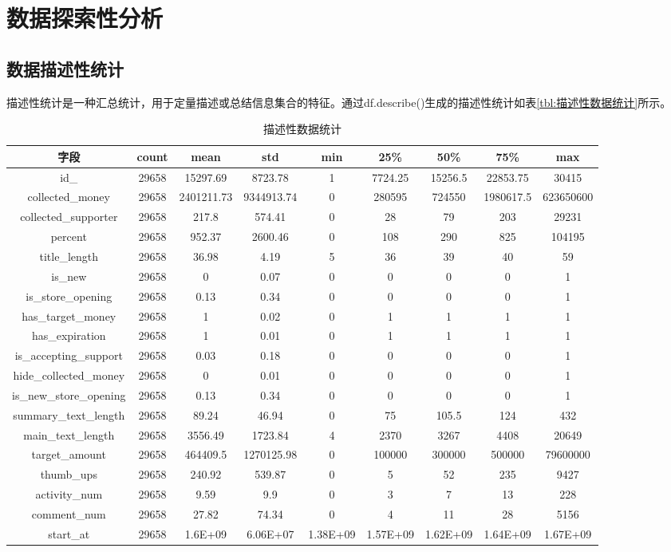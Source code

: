 \documentclass[lang=cn,a4paper]{elegantpaper}
\begin{document}
\section{数据探索性分析}
\subsection{数据描述性统计}
描述性统计是一种汇总统计，用于定量描述或总结信息集合的特征。通过df.describe()生成的描述性统计如表\ref{tbl:描述性数据统计}所示。

\begin{table}[!htbp]
\centering
\caption{描述性数据统计}
  \begin{tabular}{ccccccccc}
  \toprule
  字段&count&mean &std &min &25\% &50\% &75\% &max\\
  \midrule
  id\_&29658&15297.69&8723.78&1&7724.25&15256.5&22853.75&30415\\
  collected\_money&29658&2401211.73&9344913.74&0&280595&724550&1980617.5&623650600\\
  collected\_supporter&29658&217.8&574.41&0&28&79&203&29231\\
  percent&29658&952.37&2600.46&0&108&290&825&104195\\
  title\_length&29658&36.98&4.19&5&36&39&40&59\\
  is\_new&29658&0&0.07&0&0&0&0&1\\
  is\_store\_opening&29658&0.13&0.34&0&0&0&0&1\\
  has\_target\_money&29658&1&0.02&0&1&1&1&1\\
  has\_expiration&29658&1&0.01&0&1&1&1&1\\
  is\_accepting\_support&29658&0.03&0.18&0&0&0&0&1\\
  hide\_collected\_money&29658&0&0.01&0&0&0&0&1\\
  is\_new\_store\_opening&29658&0.13&0.34&0&0&0&0&1\\
  summary\_text\_length&29658&89.24&46.94&0&75&105.5&124&432\\
  main\_text\_length&29658&3556.49&1723.84&4&2370&3267&4408&20649\\
  target\_amount&29658&464409.5&1270125.98&0&100000&300000&500000&79600000\\
  thumb\_ups&29658&240.92&539.87&0&5&52&235&9427\\
  activity\_num&29658&9.59&9.9&0&3&7&13&228\\
  comment\_num&29658&27.82&74.34&0&4&11&28&5156\\
  start\_at&29658&1.6E+09&6.06E+07&1.38E+09&1.57E+09&1.62E+09&1.64E+09&1.67E+09\\

\end{tabular}
\end{table}
\end{document}
